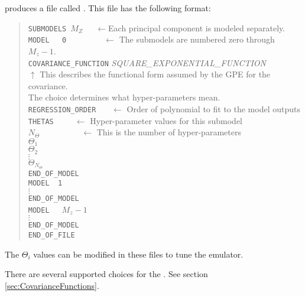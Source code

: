  produces a file called . This file has the following format:
\begin{quote}
{\tt SUBMODELS}~$M_Z$~~~$\leftarrow$Each principal component is modeled separately.\\
{\tt MODEL~~~0}~~~~~~~~~$\leftarrow$ The submodels are numbered zero through $M_z-1$.\\
{\tt COVARIANCE\_FUNCTION} {\it SQUARE\_EXPONENTIAL\_FUNCTION}\\
$\uparrow$ This describes the  functional form assumed by the GPE for the covariance.\\
The choice determines what hyper-parameters mean.\\
{\tt REGRESSION\_ORDER }~~ $\leftarrow$ Order of polynomial to fit to the model outputs\\
{\tt THETAS}~~~~~$\leftarrow$ Hyper-parameter values for this submodel\\
$N_\Theta$~~~~~~~~~~$\leftarrow$ This is the number of hyper-parameters\\
$\Theta_1$\\
$\Theta_2$\\
$\vdots$\\
$\Theta_{N_\Theta}$\\
{\tt END\_OF\_MODEL}\\
{\tt MODEL~~1}\\
$\vdots$\\
{\tt END\_OF\_MODEL}\\
{\tt MODEL}~~~{$M_z-1$}\\
$\vdots$\\
{\tt END\_OF\_MODEL}\\
{\tt END\_OF\_FILE}
\end{quote}\vspace*{-8pt}

The $\Theta_i$ values can be modified in these files to tune the emulator.

There are several supported choices for the . See section \ref{sec:CovarianceFunctions}.
